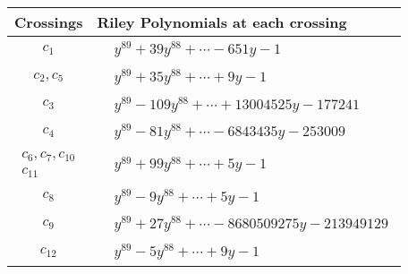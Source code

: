 \documentclass[1p]{elsarticle_modified}
\theoremstyle{definition}
\begin{document}
\begin{tabular}{m{50pt}|m{274pt}}
Crossings & \hspace{64pt}Riley Polynomials at each crossing \\
\hline $$\begin{aligned}c_{1}\end{aligned}$$&$\begin{aligned}
&y^{89}+39 y^{88}+\cdots-651 y-1
\end{aligned}$\\
\hline $$\begin{aligned}c_{2},c_{5}\end{aligned}$$&$\begin{aligned}
&y^{89}+35 y^{88}+\cdots+9 y-1
\end{aligned}$\\
\hline $$\begin{aligned}c_{3}\end{aligned}$$&$\begin{aligned}
&y^{89}-109 y^{88}+\cdots+13004525 y-177241
\end{aligned}$\\
\hline $$\begin{aligned}c_{4}\end{aligned}$$&$\begin{aligned}
&y^{89}-81 y^{88}+\cdots-6843435 y-253009
\end{aligned}$\\
\hline $$\begin{aligned}c_{6},c_{7},c_{10}\\c_{11}\end{aligned}$$&$\begin{aligned}
&y^{89}+99 y^{88}+\cdots+5 y-1
\end{aligned}$\\
\hline $$\begin{aligned}c_{8}\end{aligned}$$&$\begin{aligned}
&y^{89}-9 y^{88}+\cdots+5 y-1
\end{aligned}$\\
\hline $$\begin{aligned}c_{9}\end{aligned}$$&$\begin{aligned}
&y^{89}+27 y^{88}+\cdots-8680509275 y-213949129
\end{aligned}$\\
\hline $$\begin{aligned}c_{12}\end{aligned}$$&$\begin{aligned}
&y^{89}-5 y^{88}+\cdots+9 y-1
\end{aligned}$\\
\hline
\end{tabular}\\~\\
\end{document}
